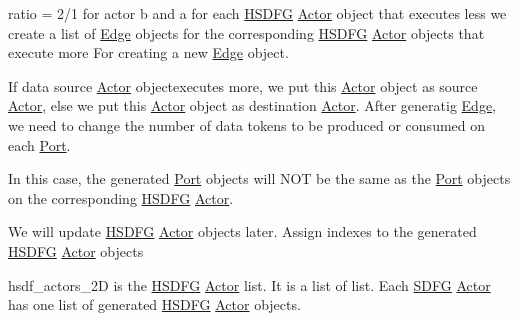{\ttfamily ratio = 2/1} for actor {\ttfamily b} and {\ttfamily a} for each \hyperlink{classsylva_1_1base_1_1sdf_1_1_h_s_d_f_g}{H\+S\+D\+FG} \hyperlink{classsylva_1_1base_1_1sdf_1_1_actor}{Actor} object that executes less we create a list of \hyperlink{classsylva_1_1base_1_1sdf_1_1_edge}{Edge} objects for the corresponding \hyperlink{classsylva_1_1base_1_1sdf_1_1_h_s_d_f_g}{H\+S\+D\+FG} \hyperlink{classsylva_1_1base_1_1sdf_1_1_actor}{Actor} objects that execute more For creating a new \hyperlink{classsylva_1_1base_1_1sdf_1_1_edge}{Edge} object.

If data source \hyperlink{classsylva_1_1base_1_1sdf_1_1_actor}{Actor} objectexecutes more, we put this \hyperlink{classsylva_1_1base_1_1sdf_1_1_actor}{Actor} object as source \hyperlink{classsylva_1_1base_1_1sdf_1_1_actor}{Actor}, else we put this \hyperlink{classsylva_1_1base_1_1sdf_1_1_actor}{Actor} object as destination \hyperlink{classsylva_1_1base_1_1sdf_1_1_actor}{Actor}. After generatig \hyperlink{classsylva_1_1base_1_1sdf_1_1_edge}{Edge}, we need to change the number of data tokens to be produced or consumed on each \hyperlink{classsylva_1_1base_1_1sdf_1_1_port}{Port}.

In this case, the generated \hyperlink{classsylva_1_1base_1_1sdf_1_1_port}{Port} objects will N\+OT be the same as the \hyperlink{classsylva_1_1base_1_1sdf_1_1_port}{Port} objects on the corresponding \hyperlink{classsylva_1_1base_1_1sdf_1_1_h_s_d_f_g}{H\+S\+D\+FG} \hyperlink{classsylva_1_1base_1_1sdf_1_1_actor}{Actor}.

We will update \hyperlink{classsylva_1_1base_1_1sdf_1_1_h_s_d_f_g}{H\+S\+D\+FG} \hyperlink{classsylva_1_1base_1_1sdf_1_1_actor}{Actor} objects later. Assign indexes to the generated \hyperlink{classsylva_1_1base_1_1sdf_1_1_h_s_d_f_g}{H\+S\+D\+FG} \hyperlink{classsylva_1_1base_1_1sdf_1_1_actor}{Actor} objects

hsdf\+\_\+actors\+\_\+2D is the \hyperlink{classsylva_1_1base_1_1sdf_1_1_h_s_d_f_g}{H\+S\+D\+FG} \hyperlink{classsylva_1_1base_1_1sdf_1_1_actor}{Actor} list. It is a list of list. Each \hyperlink{classsylva_1_1base_1_1sdf_1_1_s_d_f_g}{S\+D\+FG} \hyperlink{classsylva_1_1base_1_1sdf_1_1_actor}{Actor} has one list of generated \hyperlink{classsylva_1_1base_1_1sdf_1_1_h_s_d_f_g}{H\+S\+D\+FG} \hyperlink{classsylva_1_1base_1_1sdf_1_1_actor}{Actor} objects.

